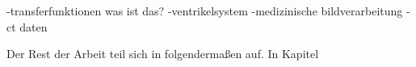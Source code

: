 \chapter{}
\label{sec:Introduction}


-transferfunktionen was ist das?
-ventrikelsystem
-medizinische bildverarbeitung
-ct daten



Der Rest der Arbeit teil sich in folgendermaßen auf. In Kapitel